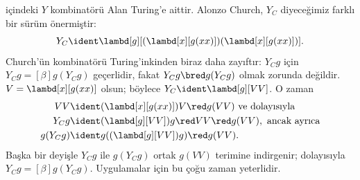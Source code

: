  içindeki $Y$ kombinatörü Alan Turing'e aittir. Alonzo
Church, $Y_C$ diyeceğimiz farklı bir sürüm önermiştir:
\[
Y_C \ident \lambd[g][(\lambd[x][g(xx)])(\lambd[x][g(xx)])].
\]
Church'ün kombinatörü Turing'inkinden biraz daha zayıftır: $Y_Cg$ için
$Y_Cg\equal[\beta]g(Y_Cg)$ geçerlidir, fakat $Y_Cg\bred g(Y_Cg)$ olmak
zorunda değildir. $V=\lambd[x][g(xx)]$ olsun; böylece
$Y_C\ident\lambd[g][VV]$. O zaman
\begin{align*}
  VV & \ident (\lambd[x][g(xx)])V \red g(VV)
  \text{ ve dolayısıyla}\\
  Y_C g & \ident (\lambd[g][VV])g \red VV \red g(VV), \text{ ancak ayrıca}\\
  g(Y_C g) & \ident g((\lambd[g][VV])g) \red g(VV).
\end{align*}
Başka bir deyişle $Y_Cg$ ile $g(Y_Cg)$ ortak $g(VV)$ terimine indirgenir;
dolayısıyla $Y_Cg\equal[\beta]g(Y_Cg)$. Uygulamalar için bu çoğu zaman
yeterlidir.

